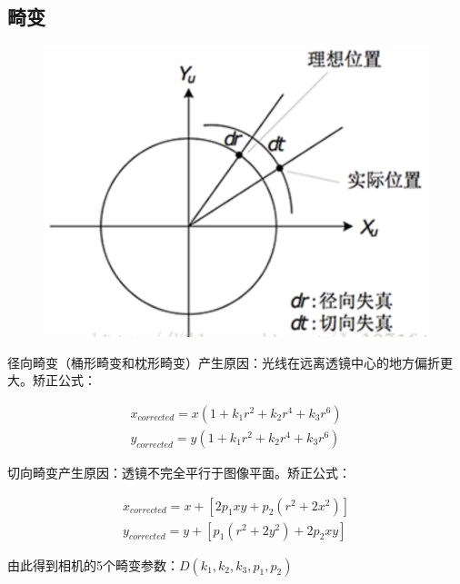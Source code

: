\documentclass[11pt]{article}
\begin{document}
\subsection{畸变}

\begin{figure}[htb]
    \centering
    \includegraphics[scale=0.2]{imgs/distortion.png}
\end{figure} 

径向畸变（桶形畸变和枕形畸变）产生原因：光线在远离透镜中心的地方偏折更大。矫正公式：

\begin{equation}
    \begin{split}
        x_{corrected} = x(1 + k_1 r^2 + k_2 r^4 + k_3 r^6) \\
        y_{corrected} = y(1 + k_1 r^2 + k_2 r^4 + k_3 r^6)
    \end{split}
\end{equation}

切向畸变产生原因：透镜不完全平行于图像平面。矫正公式：

\begin{equation}
    \begin{split}
        x_{corrected} = x + [2p_1 xy + p_2(r^2 + 2x^2)] \\
        y_{corrected} = y + [p_1(r^2 + 2y^2) + 2p_2 xy]
    \end{split}
\end{equation}

由此得到相机的5个畸变参数：$D (k_1, k_2, k_3, p_1, p_2)$
\end{document}
